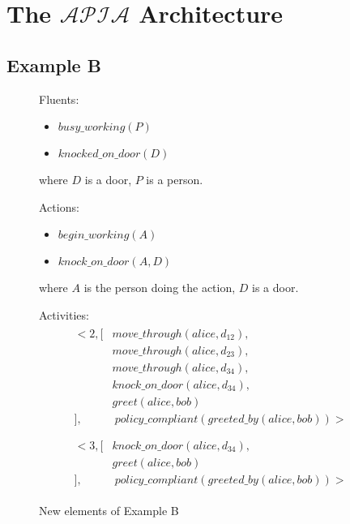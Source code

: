 \chapter{The $\mathcal{APIA}$ Architecture}
\label{appendix:apia}

\section{Example B}

\begin{figure}[H]
    \begin{framed}
        Fluents:
        \begin{itemize}
            \item $busy\_working(P)$
            \item $knocked\_on\_door(D)$
        \end{itemize}
        where $D$ is a door, $P$ is a person.

        Actions:
        \begin{itemize}
            \item $begin\_working(A)$
            \item $knock\_on\_door(A, D)$
        \end{itemize}
        where $A$ is the person doing the action, $D$ is a door.

        Activities:
        \begin{gather}
        \begin{split}
            <2, [
                & move\_through(alice, d_{12}), \\
                & move\_through(alice, d_{23}), \\
                & move\_through(alice, d_{34}), \\
                & knock\_on\_door(alice, d_{34}), \\
                & greet(alice, bob) \\
            ], & \ policy\_compliant(greeted\_by(alice, bob))> \\
        \end{split} \\
        \begin{split}
            <3, [
                & knock\_on\_door(alice, d_{34}), \\
                & greet(alice, bob) \\
            ], & \ policy\_compliant(greeted\_by(alice, bob))>
        \end{split}
        \end{gather}
    \end{framed}
    \caption{New elements of Example B}
    \label{fig:apia_example_b_description}
\end{figure}

